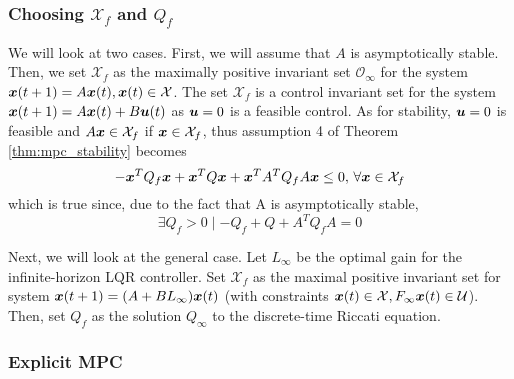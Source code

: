 \subsubsection{Choosing $\mathcal{X}_f$ and $Q_f$}

We will look at two cases. First, we will assume that $A$ is asymptotically stable. Then, we set $\mathcal{X}_f$ as the maximally positive invariant set $\mathcal{O}_\infty$ for the system $\bm{x}(t+1) = A \bm{x}(t), \bm{x}(t) \in \mathcal{X}$. The set $\mathcal{X}_f$ is a control invariant set for the system $\bm{x}(t+1) = A \bm{x}(t) + B \bm{u}(t)$ as $\bm{u}=0$ is a feasible control. As for stability, $\bm{u}=0$ is feasible and $A \bm{x} \in \mathcal{X}_f$ if $\bm{x} \in \mathcal{X}_f$, thus assumption 4 of Theorem \ref{thm:mpc_stability} becomes 
\begin{equation}
    -\bm{x}^T Q_f \bm{x} + \bm{x}^T Q \bm{x} + \bm{x}^T A^T Q_f A \bm{x} \leq 0, \, \forall \bm{x} \in \mathcal{X}_f
\end{equation}
which is true since, due to the fact that A is asymptotically stable, 
\begin{equation}
    \exists Q_f > 0 \mid - Q_f + Q + A^T Q_f A = 0
\end{equation}

Next, we will look at the general case. Let $L_\infty$ be the optimal gain for the infinite-horizon LQR controller. Set $\mathcal{X}_f$ as the maximal positive invariant set for system $\bm{x}(t+1) = (A + B L_\infty) \bm{x}(t)$ (with constraints $\bm{x}(t) \in \mathcal{X}, F_\infty \bm{x}(t) \in \mathcal{U}$). Then, set $Q_f$ as the solution $Q_\infty$ to the discrete-time Riccati equation. 

\subsubsection{Explicit MPC}

